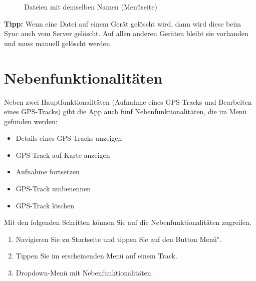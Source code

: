 \documentclass{article}
\begin{document}
\begin{enumerate}
\begin{figure}[H]
            \centering
            \caption{Dateien mit demselben Namen (Menüseite)}
        \end{figure}
        \textbf{Tipp:} Wenn eine Datei auf einem Gerät gelöscht wird, dann wird diese beim Sync auch vom Server gelöscht.
        Auf allen anderen Geräten bleibt sie vorhanden und muss manuell gelöscht werden.
    \end{enumerate}
    
    \newpage

\section{Nebenfunktionalitäten}
	Neben zwei Hauptfunktionalitäten (Aufnahme eines GPS-Tracks und Bearbeiten eines GPS-Tracks) gibt die App auch fünf Nebenfunktionalitäten, die im Menü gefunden werden: \\
	\begin{itemize}
		\item Details eines GPS-Tracks anzeigen
		\item GPS-Track auf Karte anzeigen
		\item Aufnahme fortsetzen
		\item GPS-Track umbenennen
		\item GPS-Track löschen	
	\end{itemize}
	Mit den folgenden Schritten können Sie auf die Nebenfunktionalitäten zugreifen.\\
	\begin{enumerate}
		\item Navigieren Sie zu Startseite und tippen Sie auf den Button \glqq Menü".
		\item Tippen Sie im erscheinenden Menü auf einem Track.
		\item Dropdown-Menü mit Nebenfunktionalitäten.
	\end{enumerate}		
\end{document}
